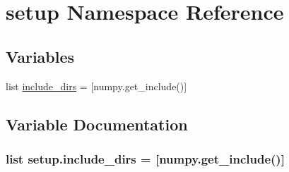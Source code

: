 \hypertarget{namespacesetup}{\section{setup Namespace Reference}
\label{namespacesetup}
}
\subsection*{Variables}
\begin{DoxyCompactItemize}
\item 
list \hyperlink{namespacesetup_a2bb788a3e756338ebbf6376e6d52e04d}{include\-\_\-dirs} = \mbox{[}numpy.\-get\-\_\-include()\mbox{]}
\end{DoxyCompactItemize}


\subsection{Variable Documentation}
\hypertarget{namespacesetup_a2bb788a3e756338ebbf6376e6d52e04d}{
\subsubsection[{include\-\_\-dirs}]{\setlength{\rightskip}{0pt plus 5cm}list setup.\-include\-\_\-dirs = \mbox{[}numpy.\-get\-\_\-include()\mbox{]}}}\label{namespacesetup_a2bb788a3e756338ebbf6376e6d52e04d}
